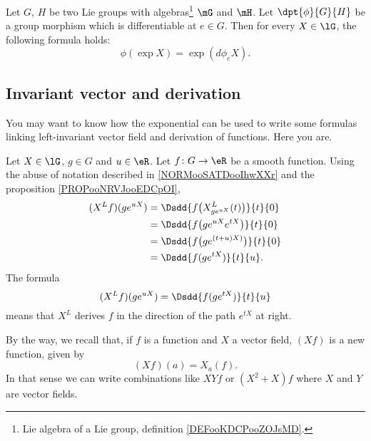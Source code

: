 \begin{lemma}		\label{lemsur5d}
    Let $G$, $H$ be two Lie groups with algebras\footnote{Lie algebra of a Lie group, definition \ref{DEFooKDCPooZOJsMD}.} $\mG$ and $\mH$. Let $\dpt{\phi}{G}{H}$ be a group morphism which is differentiable at $e\in G$. Then for every $X\in\lG$, the following formula holds:
    \begin{equation}
		\phi(\exp X)=\exp(d\phi_eX).
    \end{equation}
\end{lemma}

\subsection{Invariant vector and derivation}

You may want to know how the exponential can be used to write some formulas linking left-invariant vector field and derivation of functions. Here you are.

\begin{normaltext}
    Let \( X\in \lG\), \( g\in G\) and \( u\in \eR\). Let \( f\colon G\to \eR\) be a smooth function. Using the abuse of notation described in \ref{NORMooSATDooIhwXXr} and the proposition \ref{PROPooNRVJooEDCpOI},
    \begin{subequations}
        \begin{align}
            (X^Lf)(g e^{uX})&=\Dsdd{ f\big( X^L_{g e^{uX}}(t) \big) }{t}{0}\\
            &=\Dsdd{ f\big( g e^{uX} e^{tX} \big) }{t}{0}\\
            &=\Dsdd{ f\big( g e^{(t+u)X)} \big)}{t}{0}\\
            &=\Dsdd{ f(g e^{tX}) }{t}{u}.
        \end{align}
    \end{subequations}
    The formula
    \begin{equation}
        (X^Lf)(g e^{uX})=\Dsdd{ f(g e^{tX}) }{t}{u}
    \end{equation}
    means that \( X^L\) derives \( f\) in the direction of the path \(  e^{tX}\) at right.
\end{normaltext}

\begin{normaltext}
    By the way, we recall that, if \( f\) is a function and \( X\) a vector field, \( (Xf)\) is a new function, given by
    \begin{equation}
        (Xf)(a)=X_a(f).
    \end{equation}
    In that sense we can write combinations like \( XYf\) or \( (X^2+X)f\) where \( X\) and \( Y\) are vector fields.
\end{normaltext}

